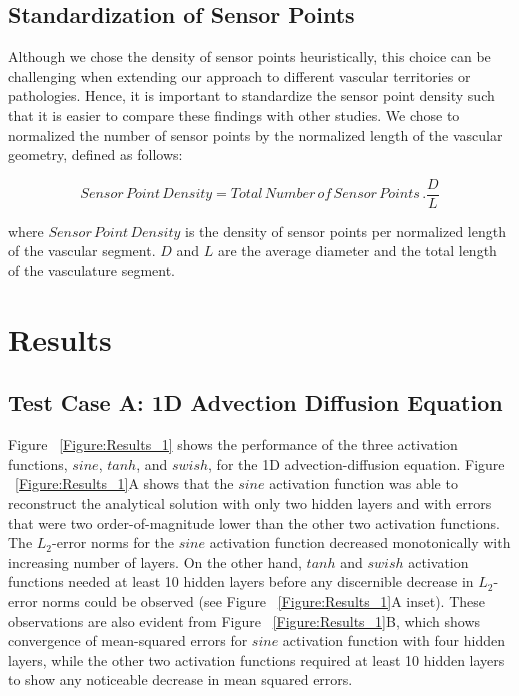 \documentclass[times,twocolumn,final]{elsarticle}
\begin{document}
{\subsection{Standardization of Sensor Points}
Although we chose the density of sensor points heuristically, this choice can be challenging when extending our approach to different vascular territories or pathologies. Hence, it is important to standardize the sensor point density such that it is easier to compare these findings with other studies. We chose to normalized the number of sensor points by the normalized length of the vascular geometry, defined as follows:

\begin{equation}
Sensor\, Point\, Density = Total\, Number\, of\, Sensor\, Points\, . \frac{D}{L} 
\end{equation}

where $Sensor\, Point\, Density$ is the density of sensor points per normalized length of the vascular segment. $D$ and $L$ are the average diameter and the total length of the vasculature segment. 

\section{Results}
\subsection{Test Case A: 1D Advection Diffusion Equation}
Figure ~\ref{Figure:Results_1} shows the performance of the three activation functions, $sine$, $tanh$, and $swish$, for the 1D advection-diffusion equation. Figure ~\ref{Figure:Results_1}A  shows that the $sine$ activation function was able to reconstruct the analytical solution with only two hidden layers and with errors that were two order-of-magnitude lower than the other two activation functions. The $L_{2}$-error norms for the $sine$ activation function decreased monotonically with increasing number of layers. On the other hand, $tanh$ and $swish$ activation functions needed at least 10 hidden layers before any discernible decrease in $L_{2}$-error norms could be observed (see Figure ~\ref{Figure:Results_1}A inset). These observations are also evident from Figure ~\ref{Figure:Results_1}B, which shows convergence of mean-squared errors for $sine$ activation function with four hidden layers, while the other two activation functions required at least 10 hidden layers to show any noticeable decrease in mean squared errors. 

}
\end{document}
